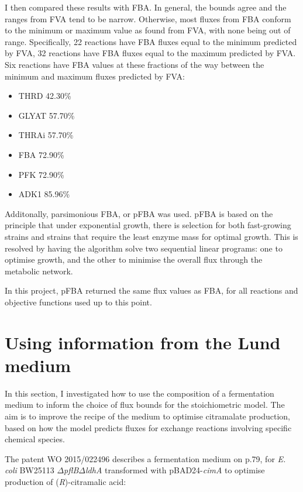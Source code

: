 \documentclass[parskip=full, numbers=noenddot]{scrreprt}
\begin{document}
I then compared these results with FBA. In general, the bounds agree and the ranges from FVA tend to be narrow. Otherwise, most fluxes from FBA conform to the minimum or maximum value as found from FVA, with none being out of range. Specifically, 22 reactions have FBA fluxes equal to the minimum predicted by FVA, 32 reactions have FBA fluxes equal to the maximum predicted by FVA. Six reactions have FBA values at these fractions of the way between the minimum and maximum fluxes predicted by FVA: %
\begin{itemize}
\item THRD 42.30\%
\item GLYAT 57.70\%
\item THRAi 57.70\%
\item FBA 72.90\%
\item PFK 72.90\%
  \item ADK1 85.96\%
  \end{itemize}

  Additonally, parsimonious FBA, or pFBA \citep{lewis_omic_2010} was used. pFBA is based on the principle that under exponential growth, there is selection for both fast-growing strains and strains that require the least enzyme mass for optimal growth. This is resolved by having the algorithm solve two sequential linear programs: one to optimise growth, and the other to minimise the overall flux through the metabolic network.

  In this project, pFBA returned the same flux values as FBA, for all reactions and objective functions used up to this point.

\section{Using information from the Lund medium}
\label{sec:lund}

In this section, I investigated how to use the composition of a fermentation medium to inform the choice of flux bounds for the stoichiometric model. The aim is to improve the recipe of the medium to optimise citramalate production, based on how the model predicts fluxes for exchange reactions involving specific chemical species.

The patent WO 2015/022496 \citep{eastham_process_2015} describes a fermentation medium on p.79, for \emph{E. coli} BW25113 $\Delta$\emph{pflB}$\Delta$\emph{ldhA} transformed with pBAD24-\emph{cimA} to optimise production of (\emph{R})-citramalic acid:
\end{document}
